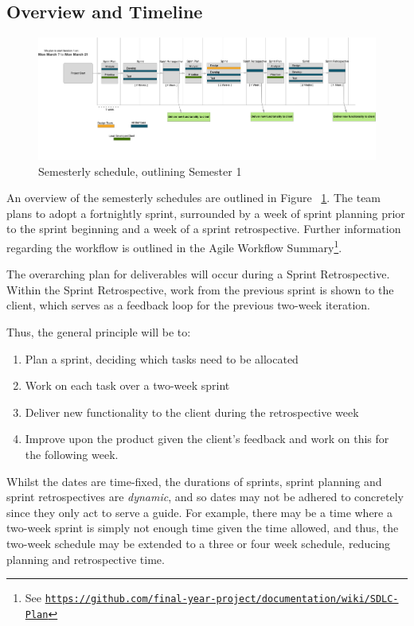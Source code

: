 \documentclass[a4paper,12pt]{article}
\renewcommand{\href}[2]{#2\footnote{See \texttt{\url{#1}}}}
\providecommand{\tightlist}{%
  \setlength{\itemsep}{0pt}\setlength{\parskip}{0pt}}
\begin{document}
\subsection{Overview and Timeline}\label{overview-and-timeline}

\begin{figure}[p]
  \centering
  \includegraphics[width=\paperwidth, angle=90]{graph.png}
  \caption{Semesterly schedule, outlining Semester 1}
  \label{fig:schedule}
\end{figure}

An overview of the semesterly schedules are outlined in Figure ~\ref{fig:schedule}. The
team plans to adopt a fortnightly sprint, surrounded by a week of sprint
planning prior to the sprint beginning and a week of a sprint
retrospective. Further information regarding the workflow is outlined in
the
\href{https://github.com/final-year-project/documentation/wiki/SDLC-Plan}{Agile
Workflow Summary}.

The overarching plan for deliverables will occur during a Sprint
Retrospective. Within the Sprint Retrospective, work from the previous
sprint is shown to the client, which serves as a feedback loop for the
previous two-week iteration.

Thus, the general principle will be to:

\begin{enumerate}
\tightlist
\def\labelenumi{\arabic{enumi}.}
\item
  Plan a sprint, deciding which tasks need to be allocated
\item
  Work on each task over a two-week sprint
\item
  Deliver new functionality to the client during the retrospective week
\item
  Improve upon the product given the client's feedback and work on this
  for the following week.
\end{enumerate}

Whilst the dates are time-fixed, the durations of sprints, sprint
planning and sprint retrospectives are \emph{dynamic}, and so dates may
not be adhered to concretely since they only act to serve a guide. For
example, there may be a time where a two-week sprint is simply not
enough time given the time allowed, and thus, the two-week schedule may
be extended to a three or four week schedule, reducing planning and
retrospective time.
\end{document}
